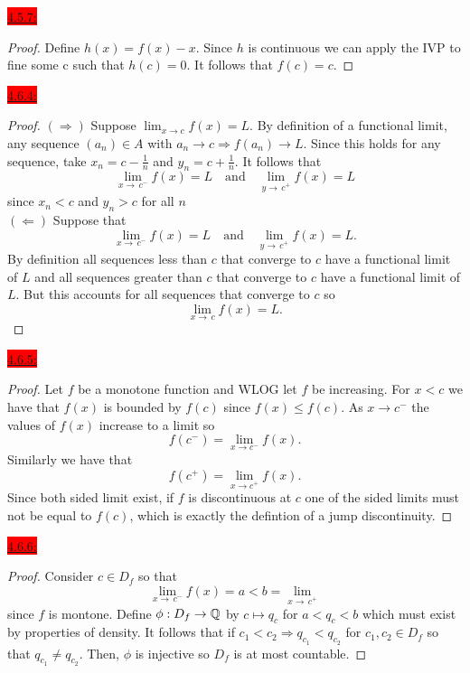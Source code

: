 \documentclass{exam}
\begin{document}
\colorbox{red}{\underline{4.5.7:}}
\begin{solution}
\begin{proof}
    Define $h(x) = f(x) - x$. Since $h$ is continuous we can apply the IVP to fine some c such that $h(c) = 0$. It follows that $f(c) = c$. 
\end{proof}    
\end{solution}

\colorbox{red}{\underline{4.6.4:}}
\begin{solution}
\begin{proof}
    $(\Rightarrow)$ Suppose $\lim_{x \to c} f(x) = L$. By definition of a functional limit, any sequence $(a_n) \in A$ with $a_n \to c \Rightarrow f(a_n) \to L$. Since this holds for any sequence, take $x_n = c - \frac{1}{n}$ and $y_n = c + \frac{1}{n}$. It follows that 
    \[
        \lim_{x\to\,c^{-}}f(x) = L \quad\text{and}\quad \lim_{y\to\,c^{+}} f(x) = L
    \]
    since $x_n < c$ and $y_n > c$ for all $n$ \\
    $(\Leftarrow)$ Suppose that 
    \[
        \lim_{x\to\,c^{-}}f(x) = L \quad\text{and}\quad \lim_{y\to\,c^{+}} f(x) = L.
    \]
    By definition all sequences less than $c$ that converge to $c$ have a functional limit of $L$ and all sequences greater than $c$ that converge to $c$ have a functional limit of $L$. But this accounts for all sequences that converge to $c$ so 
    \[
        \lim_{x\to\,c} f(x) = L. 
    \]
\end{proof}
\end{solution}

\colorbox{red}{\underline{4.6.5:}}
\begin{solution}
\begin{proof}
    Let $f$ be a monotone function and WLOG let $f$ be increasing. For $x < c$ we have that $f(x)$ is bounded by $f(c)$ since $f(x) \leq f(c)$. As $x \to c^-$ the values of $f(x)$ increase to a limit so 
    \[
        f(c^{-}) = \lim_{x \to c^{-}} f(x).  
    \]
    Similarly we have that 
    \[
        f(c^{+}) = \lim_{x \to c^{+}} f(x). 
    \]
    Since both sided limit exist, if $f$ is discontinuous at $c$ one of the sided limits must not be equal to $f(c)$, which is exactly the defintion of a jump discontinuity.
\end{proof}    
\end{solution}

\colorbox{red}{\underline{4.6.6:}}
\begin{solution}
\begin{proof}
    Consider $c \in D_f$ so that 
    \[
        \lim_{x\to\,c^{-}} f(x) = a < b = \lim_{x\to\,c^{+}}
    \]
    since $f$ is montone. Define $\phi: D_f \to \mathbb Q$ by $c \mapsto q_c$ for $a < q_c < b$ which must exist by properties of density. It follows that if $c_1 < c_2 \Rightarrow q_{c_1} < q_{c_2}$ for $c_1, c_2 \in D_f$ so that $q_{c_1} \neq q_{c_2}$. Then, $\phi$ is injective so $D_f$ is at most countable.
\end{proof}
\end{solution}
\end{document}
